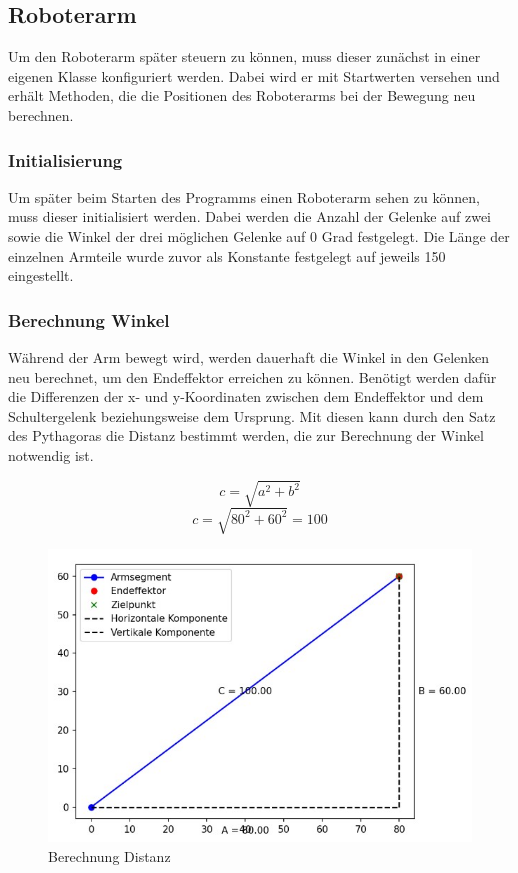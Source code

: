 \documentclass[12pt]{article}
\begin{document}
    \subsection{Roboterarm}
    Um den Roboterarm später steuern zu können, muss dieser zunächst in einer eigenen Klasse konfiguriert
    werden. Dabei wird er mit Startwerten versehen und erhält Methoden, die die Positionen des Roboterarms
    bei der Bewegung neu berechnen.

    \subsubsection{Initialisierung}
    Um später beim Starten des Programms einen Roboterarm sehen zu können, muss dieser initialisiert
    werden. Dabei werden die Anzahl der Gelenke auf zwei sowie die Winkel der drei möglichen Gelenke
    auf 0 Grad festgelegt. Die Länge der einzelnen Armteile wurde zuvor als Konstante festgelegt auf
    jeweils 150 eingestellt.

    

    \subsubsection{Berechnung Winkel}
    Während der Arm bewegt wird, werden dauerhaft die Winkel in den Gelenken neu berechnet, um den
    Endeffektor erreichen zu können. Benötigt werden dafür die Differenzen der x- und y-Koordinaten
    zwischen dem Endeffektor und dem Schultergelenk beziehungsweise dem Ursprung. Mit diesen kann durch
    den Satz des Pythagoras die Distanz bestimmt werden, die zur Berechnung der Winkel notwendig ist.

    \[
        c = \sqrt{a^2 + b^2}
    \]
    \[
        c = \sqrt{80^2 + 60^2} = 100
    \]

    \begin{figure}[h!]
        \centering
        \includegraphics[width = \linewidth]{Bild 1}
        \caption{Berechnung Distanz}
    \end{figure}
\end{document}
